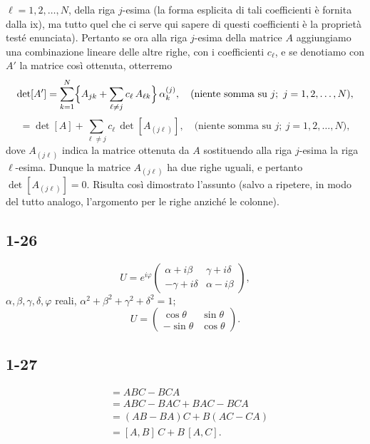 \documentclass[11pt, a4paper]{book}
\numberwithin{equation}{section}
\begin{document}

$\ell=1,2,\ldots,N$, della riga $j$-esima (la forma esplicita di tali
coefficienti è fornita dalla ix), ma tutto quel che ci serve qui sapere di
questi coefficienti è la proprietà testé enunciata). Pertanto se ora alla
riga $j$-esima della matrice $A$ aggiungiamo una combinazione lineare
delle altre righe, con i coefficienti $c_\ell$, e se denotiamo con $A'$
la matrice così ottenuta, otterremo
\[
\det[A'] = \sum_{k=1}^{N}
\Bigl\{A_{jk} + \sum_{\ell\neq j} c_\ell\,A_{\ell k}\Bigr\}\,\alpha_k^{(j)},
\quad \text{(niente somma su }j;\ j=1,2,\ldots,N\text{)},
\]
\[
= \det[A] + \sum_{\ell\neq j} c_\ell\,\det[A_{(j\ell)}],
\quad \text{(niente somma su }j;\ j=1,2,\ldots,N\text{)},
\]
dove $A_{(j\ell)}$ indica la matrice ottenuta da $A$ sostituendo alla
riga $j$-esima la riga $\ell$-esima. Dunque la matrice $A_{(j\ell)}$ ha
due righe uguali, e pertanto $\det[A_{(j\ell)}] = 0$. Risulta così
dimostrato l'assunto (salvo a ripetere, in modo del tutto analogo,
l'argomento per le righe anziché le colonne).

\subsection*{1-26}
\[
U = e^{i\varphi}
\begin{pmatrix}
\alpha+i\beta & \gamma+i\delta \\
-\gamma+i\delta & \alpha-i\beta
\end{pmatrix},
\]
$\alpha,\beta,\gamma,\delta,\varphi$ reali, $\alpha^2+\beta^2+\gamma^2+\delta^2=1$;
\[
U =
\begin{pmatrix}
\cos\theta & \sin\theta \\
-\sin\theta & \cos\theta
\end{pmatrix}.
\]

\subsection*{1-27}
\begin{align*}
[A, BC] &= ABC - BCA \\
  &= ABC - BAC + BAC - BCA \\
  &= (AB-BA)C + B(AC-CA) \\
  &= [A,B]\,C + B\,[A,C].
\end{align*}
\end{document}
